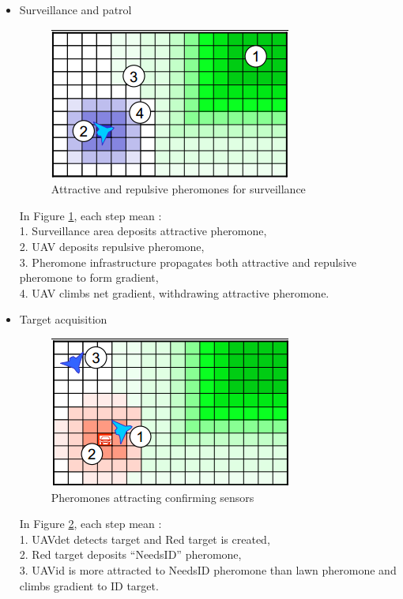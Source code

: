 \begin{itemize}
\item Surveillance and patrol

\begin{figure}[h]
\center
\includegraphics[scale=0.7]{../images/pheromone_surveillance.png}
\caption{\label{surveillance}Attractive and repulsive pheromones for surveillance\cite{PerformanceOfDigitalPheromones10}}
\end{figure}

In Figure \ref{surveillance}, each step mean :\\
 1. Surveillance area deposits attractive pheromone,\\
 2. UAV deposits repulsive pheromone,\\ 
 3. Pheromone infrastructure propagates both attractive and repulsive pheromone to form gradient,\\
 4. UAV climbs net gradient, withdrawing attractive pheromone.
 
\newpage
 
\item Target acquisition

\begin{figure}[h]
\center
\includegraphics[scale=0.7]{../images/pheromone_target_acquisition.png}
\caption{\label{targetacquisition}Pheromones attracting confirming sensors\cite{PerformanceOfDigitalPheromones10}}
\end{figure}

In Figure \ref{targetacquisition}, each step mean :\\
1. UAVdet detects target and Red target is created,\\
2. Red target deposits “NeedsID” pheromone, \\
3. UAVid is more attracted to NeedsID pheromone than lawn pheromone and climbs gradient to ID target.


\end{itemize}
